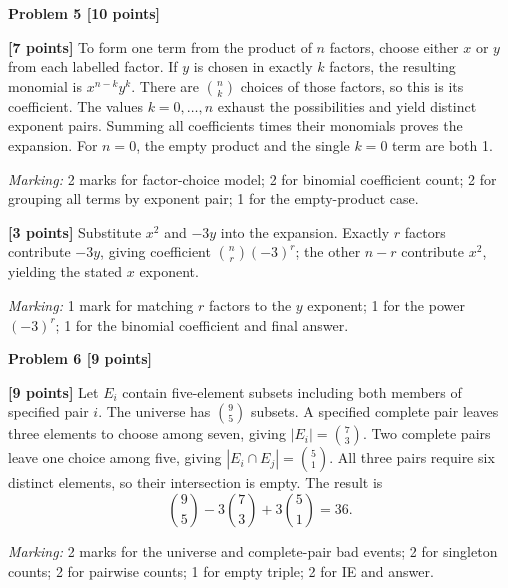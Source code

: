 \documentclass[12pt,letterpaper]{article}
\newcommand{\problemheading}[2][5\baselineskip]{\Needspace{#1}\par\noindent\hspace*{-0.625in}\textbf{#2}\par\nobreak\vspace{0.3em}}
\begin{document}
\vspace{0.65em}
\problemheading[\dimexpr 3\baselineskip+4\baselineskip\relax]{Problem 5 [10 points]}
\begin{description}[font=\normalfont,leftmargin=1.2em,labelsep=0.4em]
\item[(a)] \textbf{[7 points]} To form one term from the product of $n$ factors, choose either $x$ or $y$ from each labelled factor. If $y$ is chosen in exactly $k$ factors, the resulting monomial is $x^{n-k}y^k$. There are $\binom nk$ choices of those factors, so this is its coefficient. The values $k=0,\ldots,n$ exhaust the possibilities and yield distinct exponent pairs. Summing all coefficients times their monomials proves the expansion. For $n=0$, the empty product and the single $k=0$ term are both 1.
\par\textit{Marking:} 2 marks for factor-choice model; 2 for binomial coefficient count; 2 for grouping all terms by exponent pair; 1 for the empty-product case.
\item[(b)] \textbf{[3 points]} Substitute $x^2$ and $-3y$ into the expansion. Exactly $r$ factors contribute $-3y$, giving coefficient $\binom nr(-3)^r$; the other $n-r$ contribute $x^2$, yielding the stated $x$ exponent.
\par\textit{Marking:} 1 mark for matching $r$ factors to the $y$ exponent; 1 for the power $(-3)^r$; 1 for the binomial coefficient and final answer.
\end{description}
\vspace{0.65em}
\problemheading[\dimexpr 3\baselineskip+4\baselineskip\relax]{Problem 6 [9 points]}
\begin{description}[font=\normalfont,leftmargin=1.2em,labelsep=0.4em]
\item[] \textbf{[9 points]} Let $E_i$ contain five-element subsets including both members of specified pair $i$. The universe has $\binom95$ subsets. A specified complete pair leaves three elements to choose among seven, giving $|E_i|=\binom73$. Two complete pairs leave one choice among five, giving $|E_i\cap E_j|=\binom51$. All three pairs require six distinct elements, so their intersection is empty. The result is\[\binom95-3\binom73+3\binom51=36.\]
\par\textit{Marking:} 2 marks for the universe and complete-pair bad events; 2 for singleton counts; 2 for pairwise counts; 1 for empty triple; 2 for IE and answer.
\end{description}
\vspace{0.65em}
\end{document}
